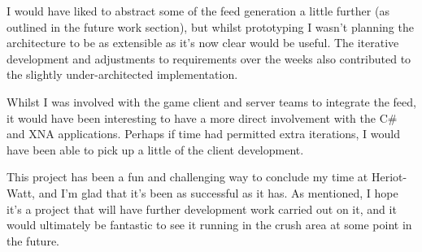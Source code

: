 I would have liked to abstract some of the feed generation a little further (as outlined in the future work section), but whilst prototyping I wasn't planning the architecture to be as extensible as it's now clear would be useful. The iterative development and adjustments to requirements over the weeks also contributed to the slightly under-architected implementation.

Whilst I was involved with the game client and server teams to integrate the feed, it would have been interesting to have a more direct involvement with the C\# and XNA applications. Perhaps if time had permitted extra iterations, I would have been able to pick up a little of the client development.

This project has been a fun and challenging way to conclude my time at Heriot-Watt, and I'm glad that it's been as successful as it has. As mentioned, I hope it's a project that will have further development work carried out on it, and it would ultimately be fantastic to see it running in the crush area at some point in the future.